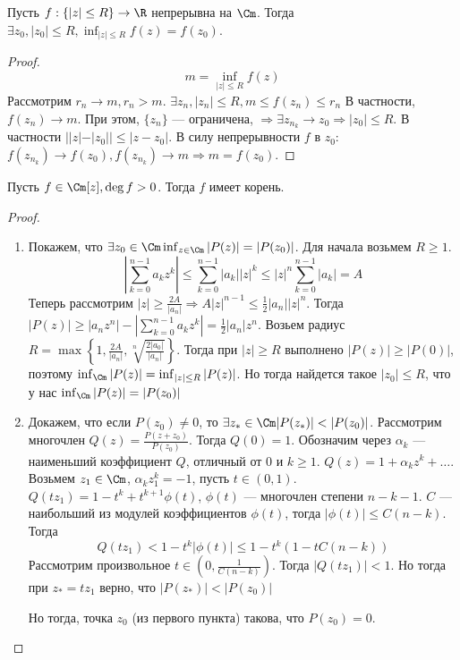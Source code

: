 \begin{proposition}
    Пусть $f: \{|z| \le R\} \rightarrow \R$ непрерывна на $\Cm$. Тогда $\exists z_0, |z_0| \le R, \inf_{|z| \le R} f(z) = f(z_0)$.
\end{proposition}
\begin{proof}
    $$m = \inf_{|z| \le R} f(z)$$
    Рассмотрим $r_n \rightarrow m, r_n > m$. $\exists z_n, |z_n| \le R, m \le f(z_n) \le r_n$
    В частности, $f(z_n) \rightarrow m$. При этом, $\{z_n\}$ --- ограничена, $\Rightarrow \exists z_{n_k} \rightarrow  z_0 \Rightarrow |z_0| \le R$. В частности $||z| - |z_0|| \le |z - z_0|$. В силу непрерывности $f$ в $z_0$: $f(z_{n_k}) \rightarrow f(z_0), f(z_{n_k}) \rightarrow m \Rightarrow m = f(z_0)$.
\end{proof}

\begin{theorem}
    Пусть \(f \in \Cm[z], \deg f > 0\). Тогда \(f\) имеет корень.
\end{theorem}
\begin{proof}
    \begin{enumerate}
        \item Покажем, что $\exists z_0 \in \Cm \inf_{z \in \Cm} |P(z)| = |P(z_0)|$. Для начала возьмем $R \ge 1$. 
        $$\left|\sum_{k = 0}^{n-1} a_kz^k\right| \le \sum_{k = 0}^{n-1} |a_k||z|^k \le |z|^n\sum_{k = 0}^{n-1}|a_k| = A$$
        Теперь рассмотрим $|z| \ge \frac{2A}{|a_n|} \Rightarrow A|z|^{n-1} \le \frac{1}{2}|a_n||z|^n$. Тогда $|P(z)| \ge |a_nz^n| - \left|\sum_{k = 0}^{n-1}a_kz^k\right| = \frac{1}{2}|a_n|z^n$. Возьем радиус $R = \max\left\{1, \frac{2A}{|a_n|}, \sqrt[n]{\frac{2|a_0|}{|a_n|}}\right\}$. Тогда при $|z| \ge R$ выполнено $|P(z)| \ge |P(0)|$, поэтому $\inf_{\Cm}|P(z)| = \inf_{|z| \le R}|P(z)|$. Но тогда найдется такое $|z_0| \le R$, что у нас $\inf_{\Cm}|P(z)| = |P(z_0)|$
        \item Докажем, что если $P(z_0) \ne 0$, то $\exists z_* \in \Cm |P(z_*)| < |P(z_0)|$. Рассмотрим многочлен $Q(z) = \frac{P(z + z_0)}{P(z_0)}$. Тогда $Q(0) = 1$. Обозначим через $\alpha_k$ --- наименьший коэффициент $Q$, отличный от 0 и $k \ge 1$. $Q(z) = 1 + \alpha_kz^k + \dots$. Возьмем $z_1 \in \Cm$, $\alpha_kz_1^k = -1$, пусть $t \in (0, 1)$. $Q(tz_1) = 1 - t^k + t^{k+1}\phi(t)$, $\phi(t)$ --- многочлен степени $n - k - 1$. $C$ --- наибольший из модулей коэффициентов $\phi(t)$, тогда $|\phi(t)| \le C(n - k)$. Тогда
        $$Q(tz_1) < 1 - t^k|\phi(t)| \le 1 - t^k(1 - tC(n - k))$$
        Рассмотрим произвольное $t \in \left(0, \frac{1}{C(n - k)}\right)$. Тогда $|Q(tz_1)| < 1$. Но тогда при $z_* = tz_1$ верно, что $|P(z_*)| < |P(z_0)|$
        
        Но тогда, точка $z_0$ (из первого пункта) такова, что $P(z_0) = 0$.
    \end{enumerate}
\end{proof}

